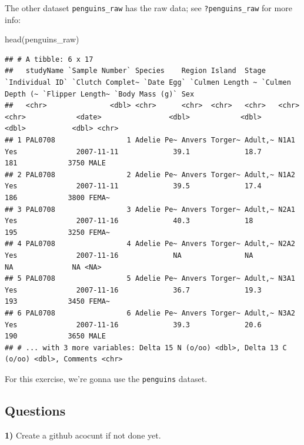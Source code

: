 \documentclass[
  12pt,
]{book}
\newenvironment{Shaded}{\begin{snugshade}}{\end{snugshade}}
\newcommand{\FunctionTok}[1]{\textcolor[rgb]{0.00,0.00,0.00}{#1}}
\newcommand{\NormalTok}[1]{#1}
\begin{document}
The other dataset \texttt{penguins\_raw} has the raw data; see \texttt{?penguins\_raw} for more info:

\begin{Shaded}
\begin{Highlighting}[]
\FunctionTok{head}\NormalTok{(penguins\_raw)}
\end{Highlighting}
\end{Shaded}

\begin{verbatim}
## # A tibble: 6 x 17
##   studyName `Sample Number` Species    Region Island  Stage   `Individual ID` `Clutch Complet~ `Date Egg` `Culmen Length ~ `Culmen Depth (~ `Flipper Length~ `Body Mass (g)` Sex  
##   <chr>               <dbl> <chr>      <chr>  <chr>   <chr>   <chr>           <chr>            <date>                <dbl>            <dbl>            <dbl>           <dbl> <chr>
## 1 PAL0708                 1 Adelie Pe~ Anvers Torger~ Adult,~ N1A1            Yes              2007-11-11             39.1             18.7              181            3750 MALE 
## 2 PAL0708                 2 Adelie Pe~ Anvers Torger~ Adult,~ N1A2            Yes              2007-11-11             39.5             17.4              186            3800 FEMA~
## 3 PAL0708                 3 Adelie Pe~ Anvers Torger~ Adult,~ N2A1            Yes              2007-11-16             40.3             18                195            3250 FEMA~
## 4 PAL0708                 4 Adelie Pe~ Anvers Torger~ Adult,~ N2A2            Yes              2007-11-16             NA               NA                 NA              NA <NA> 
## 5 PAL0708                 5 Adelie Pe~ Anvers Torger~ Adult,~ N3A1            Yes              2007-11-16             36.7             19.3              193            3450 FEMA~
## 6 PAL0708                 6 Adelie Pe~ Anvers Torger~ Adult,~ N3A2            Yes              2007-11-16             39.3             20.6              190            3650 MALE 
## # ... with 3 more variables: Delta 15 N (o/oo) <dbl>, Delta 13 C (o/oo) <dbl>, Comments <chr>
\end{verbatim}

For this exercise, we're gonna use the \texttt{penguins} dataset.

\hypertarget{questions-1}{%
\subsection{Questions}\label{questions-1}}

\textbf{1)} Create a github acocunt if not done yet.
\end{document}
